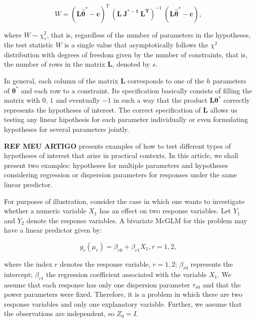 \documentclass[article]{jss}\usepackage[]{graphicx}\usepackage[]{xcolor}
\begin{document}
$$
W = (\boldsymbol{L\hat\theta^{*}} - \boldsymbol{c})^T \ (\boldsymbol{L \ J^{\boldsymbol{*}-1} \ L^T})^{-1} \ (\boldsymbol{L\hat\theta^{*}} - \boldsymbol{c}),
$$

\noindent where $W \sim \chi^2_s$, that is, regardless of the number of parameters in the hypotheses, the test statistic $W$ is a single value that asymptotically follows the $\chi^2$ distribution with degrees of freedom given by the number of constraints, that is, the number of rows in the matrix $\boldsymbol{L}$, denoted by $s$.

In general, each column of the matrix $\boldsymbol{L}$ corresponds to one of the $h$ parameters of $\boldsymbol{\theta^{*}}$ and each row to a constraint. Its specification basically consists of filling the matrix with $0$, $1$ and eventually $-1$ in such a way that the product $\boldsymbol{L}\boldsymbol{\theta^{*}}$ correctly represents the hypotheses of interest. The correct specification of $\boldsymbol{L}$ allows us testing any linear hipothesis for each parameter individually or even formulating hypotheses for several parameters jointly.

\textbf{REF MEU ARTIGO} presents examples of how to test different types of hypotheses of interest that arise in practical contexts. In this article, we shall present two examples: hypotheses for multiple parameters and hypotheses considering regression or dispersion parameters for responses under the same linear predictor.

For purposes of illustration, consider the case in which one wants to investigate whether a numeric variable $X_1$ has an effect on two response variables. Let $Y_1$ and $Y_2$ denote the response variables. A bivariate McGLM for this problem may have a linear predictor given by:

\begin{equation}
\label{eq:pred_ex}
g_r(\mu_r) = \beta_{r0} + \beta_{r1} X_1, r=1,2,
\end{equation}

\noindent where the index $r$ denotes the response variable, $r = 1,2$; $\beta_{r0}$ represents the intercept; $\beta_{r1}$ the regression coefficient associated with the variable $X_1$. We assume that each response has only one dispersion parameter $\tau_{r0}$ and that the power parameters were fixed. Therefore, it is a problem in which there are two response variables and only one explanatory variable. Further, we assume that the observations are independent, so $Z_0 = I$. 
\end{document}
